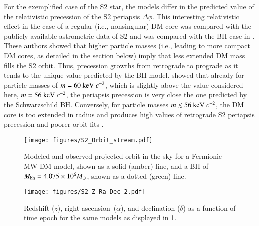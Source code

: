 \documentclass[twocolumn]{aa}
\begin{document}
For the exemplified case of the S2 star, the models differ in the predicted value of the relativistic precession of the S2 periapsis $\Delta \phi$. This interesting relativistic effect in the case of a regular (i.e., nonsingular) DM core was compared with the publicly available astrometric data of S2 and was compared with the BH case in \cite{2022MNRAS.511L..35A}. These authors showed that higher particle masses (i.e., leading to more compact DM cores, as detailed in the section below) imply that less extended DM mass fills the S2 orbit. Thus, precession growths from retrograde to prograde as it tends to the unique value predicted by the BH model. \cite{2022MNRAS.511L..35A} showed that already for particle masses of $m = 60~{\rm keV}~c^{-2}$, which is slightly above the value considered here, $m=56~{\rm keV}~c^{-2}$, the periapsis precession is very close the one predicted by the Schwarzschild BH. Conversely, for particle masses $m\lesssim 56~{\rm keV}~c^{-2}$, the DM core is too extended in radius and produces high values of retrograde S2 periapsis precession and poorer orbit fits \citep{2020A&A...641A..34B,2022MNRAS.511L..35A}. %
%
%
\begin{figure}
   \texttt{[image: figures/S2\_Orbit\_stream.pdf]}
\caption{Modeled and observed projected orbit in the sky for a Fermionic-MW DM model, shown as a solid (amber) line, and a BH of $M_{\rm bh}=4.075\times 10^6 M_\odot$, shown as a dotted (green) line.}
   \label{fig:S2_fit}
\end{figure}

\begin{figure}
   \texttt{[image: figures/S2\_Z\_Ra\_Dec\_2.pdf]}
   \caption{Redshift ($z$), right ascension~($\alpha$), and declination ($\delta$) as a function of time epoch for the same models as
   displayed in \cref{fig:S2_fit}.}
   \label{fig:S2_fit_b}
\end{figure}
\end{document}
